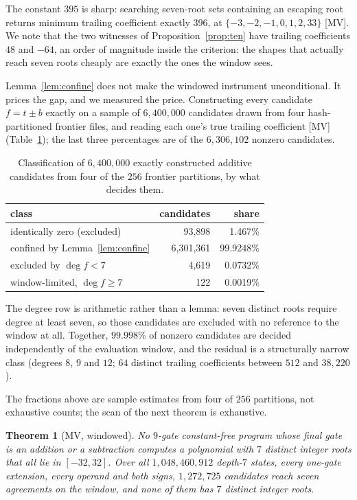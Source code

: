 \documentclass[11pt]{article}
\newtheorem{theorem}{Theorem}[section]
\theoremstyle{definition}
\theoremstyle{remark}
\begin{document}
The constant $395$ is sharp: searching seven-root sets containing an escaping root
returns minimum trailing coefficient exactly $396$, at
$\{-3,-2,-1,0,1,2,33\}$ [MV]. We note that the two witnesses of
Proposition~\ref{prop:ten} have trailing coefficients $48$ and $-64$, an order
of magnitude inside the criterion: the shapes that actually reach seven roots
cheaply are exactly the ones the window sees.

Lemma~\ref{lem:confine} does not make the windowed instrument unconditional. It
prices the gap, and we measured the price. Constructing every candidate
$f = t \pm b$ exactly on a sample of $6{,}400{,}000$ candidates drawn from four
hash-partitioned frontier files, and reading each one's true trailing
coefficient [MV] (Table~\ref{tab:window}); the last three percentages are of the
$6{,}306{,}102$ nonzero candidates.

\begin{table}[t]
\centering
\caption{Classification of $6{,}400{,}000$ exactly constructed additive candidates from four
of the $256$ frontier partitions, by what decides them.}
\label{tab:window}
\begin{tabular}{lrr}
\toprule
class & candidates & share\\\midrule
identically zero (excluded) & 93{,}898 & 1.467\%\\
confined by Lemma~\ref{lem:confine} & 6{,}301{,}361 & 99.9248\%\\
excluded by $\deg f < 7$ & 4{,}619 & 0.0732\%\\
window-limited, $\deg f \ge 7$ & 122 & 0.0019\%\\
\bottomrule
\end{tabular}
\end{table}

The
degree row is arithmetic rather than a lemma: seven distinct roots require
degree at least seven, so those candidates are excluded with no reference to the
window at all. Together, $99.998\%$ of nonzero candidates are decided
independently of the evaluation window, and the residual is a structurally
narrow class (degrees $8$, $9$ and $12$; $64$ distinct trailing coefficients
between $512$ and $38{,}220$).

The fractions above are sample estimates from four of $256$ partitions, not
exhaustive counts; the scan of the next theorem is exhaustive.

\begin{theorem}[MV, windowed]\label{thm:nine-add}
No $9$-gate constant-free program whose final gate is an addition or a subtraction
computes a polynomial with $7$ distinct integer roots that all lie in $[-32,32]$.
Over all $1{,}048{,}460{,}912$ depth-$7$ states, every one-gate extension, every
operand and both signs, $1{,}272{,}725$ candidates reach seven agreements on the
window, and none of them has $7$ distinct integer roots.
\end{theorem}
\end{document}
